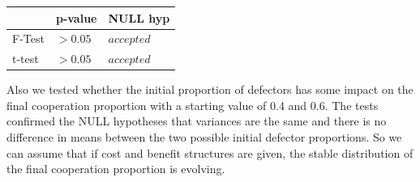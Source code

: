 \documentclass[DIV=calc, paper=a4, fontsize=11pt, twocolumn]{scrartcl}	 %
\begin{document}
\begin{tabular}{l|ll}
\centering
  & p-value & NULL hyp \\
\midrule
F-Test & $>0.05$ & $accepted$ \\
t-test & $>0.05$ & $accepted$ \\
\end{tabular}

\noindent Also we tested whether the initial proportion of defectors has some impact on the final cooperation proportion with a starting value of 0.4 and 0.6. The tests confirmed the NULL hypotheses that variances are the same and there is no difference in means between the two possible initial defector proportions. So we can assume that if cost and benefit structures are given, the stable distribution of the final cooperation proportion is evolving. 


\nocite{Albizu2013}



\end{document}
